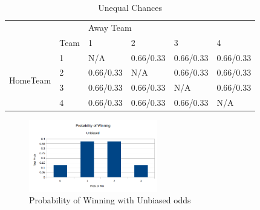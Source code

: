 \documentclass[12pt]{article}
\begin{document}
\begin{table}[H]
\centering
\caption{Unequal Chances}
\label{my-label}
\begin{tabular}{ll|l|l|l|l|}
\cline{3-6}
                                                &      & \multicolumn{4}{l|}{Away Team}    \\ \cline{2-6} 
\multicolumn{1}{l|}{}                           & Team & 1      & 2      & 3      & 4      \\ \hline
\multicolumn{1}{|l|}{\multirow{4}{*}{HomeTeam}} & 1    & N/A    & 0.66/0.33 & 0.66/0.33 & 0.66/0.33 \\ \cline{2-6} 
\multicolumn{1}{|l|}{}                          & 2    & 0.66/0.33 & N/A    & 0.66/0.33 & 0.66/0.33 \\ \cline{2-6} 
\multicolumn{1}{|l|}{}                          & 3    & 0.66/0.33 & 0.66/0.33 & N/A    & 0.66/0.33 \\ \cline{2-6} 
\multicolumn{1}{|l|}{}                          & 4    & 0.66/0.33 & 0.66/0.33 & 0.66/0.33 & N/A    \\ \hline
\end{tabular}
\end{table}

\begin{figure}[H]
\centering
\includegraphics[width=0.5\textwidth]{win_u.png}
\caption{Probability of Winning with Unbiased odds}
\end{figure}
\end{document}
